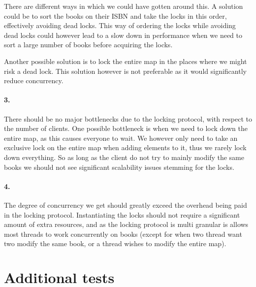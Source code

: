 \documentclass[a4paper, 11pt]{article}
\begin{document}
There are different ways in which we could have gotten around this. A solution could be to sort the books on their ISBN and take the locks in this order, effectively avoiding dead locks. This way of ordering the locks while avoiding dead locks could however lead to a slow down in performance when we need to sort a large number of books before acquiring the locks.

Another possible solution is to lock the entire map in the places where we might risk a dead lock. This solution however is not preferable as it would significantly reduce concurrency.


\paragraph{3.} %
\label{par:3_}

There should be no major bottlenecks due to the locking protocol, with respect to the number of clients. One possible bottleneck is when we need to lock down the entire map, as this causes everyone to wait. We however only need to take an exclusive lock on the entire map when adding elements to it, thus we rarely lock down everything. So as long as the client do not try to mainly modify the same books we should not see significant scalability issues stemming for the locks.


\paragraph{4.} %
\label{par:4_}

The degree of concurrency we get should greatly exceed the overhead being paid in the locking protocol. Instantiating the locks should not require a significant amount of extra resources, and as the locking protocol is multi granular is allows most threads to work concurrently on books (except for when two thread want two modify the same book, or a thread wishes to modify the entire map).



\section{Additional tests} %
\label{sec:additional_tests}
\end{document}
